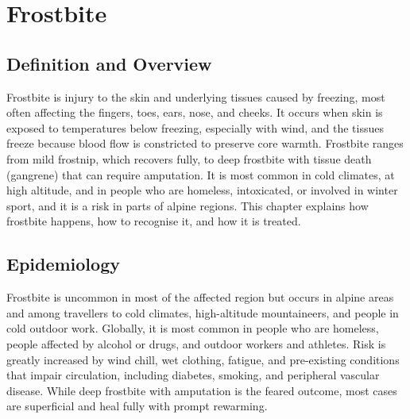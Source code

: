 \chapter{Frostbite}

\section*{Definition and Overview}
Frostbite is injury to the skin and underlying tissues caused by freezing, most often affecting the fingers, toes, ears, nose, and cheeks. It occurs when skin is exposed to temperatures below freezing, especially with wind, and the tissues freeze because blood flow is constricted to preserve core warmth. Frostbite ranges from mild frostnip, which recovers fully, to deep frostbite with tissue death (gangrene) that can require amputation. It is most common in cold climates, at high altitude, and in people who are homeless, intoxicated, or involved in winter sport, and it is a risk in parts of alpine regions. This chapter explains how frostbite happens, how to recognise it, and how it is treated.

\section*{Epidemiology}
Frostbite is uncommon in most of the affected region but occurs in alpine areas and among travellers to cold climates, high-altitude mountaineers, and people in cold outdoor work. Globally, it is most common in people who are homeless, people affected by alcohol or drugs, and outdoor workers and athletes. Risk is greatly increased by wind chill, wet clothing, fatigue, and pre-existing conditions that impair circulation, including diabetes, smoking, and peripheral vascular disease. While deep frostbite with amputation is the feared outcome, most cases are superficial and heal fully with prompt rewarming.


